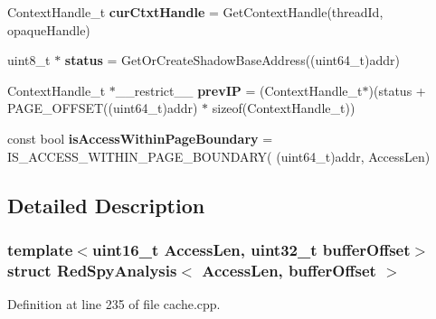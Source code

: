 \begin{DoxyCompactItemize}
\item 
\hypertarget{structRedSpyAnalysis_a9f168c58300b74eac72b95c487694535}{Context\-Handle\-\_\-t {\bfseries cur\-Ctxt\-Handle} = Get\-Context\-Handle(thread\-Id, opaque\-Handle)}\label{structRedSpyAnalysis_a9f168c58300b74eac72b95c487694535}

\item 
\hypertarget{structRedSpyAnalysis_a964285911b4891f02075a6166a418af7}{uint8\-\_\-t $\ast$ {\bfseries status} = Get\-Or\-Create\-Shadow\-Base\-Address((uint64\-\_\-t)addr)}\label{structRedSpyAnalysis_a964285911b4891f02075a6166a418af7}

\item 
\hypertarget{structRedSpyAnalysis_a8cd17a8082091e09c39a51421db9bcdd}{Context\-Handle\-\_\-t $\ast$\-\_\-\-\_\-restrict\-\_\-\-\_\- {\bfseries prev\-I\-P} = (Context\-Handle\-\_\-t$\ast$)(status + P\-A\-G\-E\-\_\-\-O\-F\-F\-S\-E\-T((uint64\-\_\-t)addr) $\ast$ sizeof(Context\-Handle\-\_\-t))}\label{structRedSpyAnalysis_a8cd17a8082091e09c39a51421db9bcdd}

\item 
\hypertarget{structRedSpyAnalysis_ac49171f2c33bb814637abba580b777c3}{const bool {\bfseries is\-Access\-Within\-Page\-Boundary} = I\-S\-\_\-\-A\-C\-C\-E\-S\-S\-\_\-\-W\-I\-T\-H\-I\-N\-\_\-\-P\-A\-G\-E\-\_\-\-B\-O\-U\-N\-D\-A\-R\-Y( (uint64\-\_\-t)addr, Access\-Len)}\label{structRedSpyAnalysis_ac49171f2c33bb814637abba580b777c3}

\end{DoxyCompactItemize}


\subsection{Detailed Description}
\subsubsection*{template$<$uint16\-\_\-t Access\-Len, uint32\-\_\-t buffer\-Offset$>$struct Red\-Spy\-Analysis$<$ Access\-Len, buffer\-Offset $>$}



Definition at line 235 of file cache.\-cpp.



